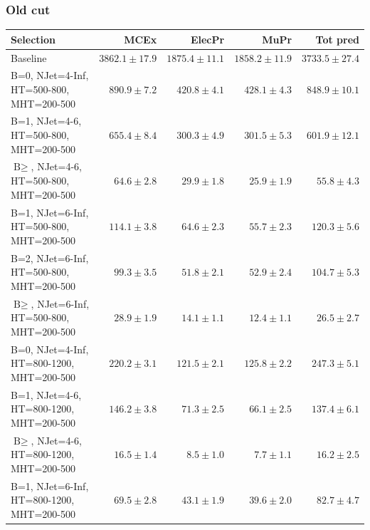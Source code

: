 \documentclass{beamer}
\begin{document}
\begin{frame}
\frametitle{Old \deltaphi cut}
\tiny
 \begin{tabular}{lrrrr}
\toprule
                                       Selection  &                     MCEx  &           ElecPr  &             MuPr  &          Tot pred  \\ 
\midrule
                                        Baseline &           $3862.1\pm17.9$&           $1875.4\pm11.1$&           $1858.2\pm11.9$&               $3733.5\pm27.4$ \\ 
    B=0, NJet=4-Inf, HT=500-800, MHT=200-500 &             $890.9\pm7.2$&             $420.8\pm4.1$&             $428.1\pm4.3$&                $848.9\pm10.1$ \\ 
      B=1, NJet=4-6, HT=500-800, MHT=200-500 &             $655.4\pm8.4$&             $300.3\pm4.9$&             $301.5\pm5.3$&                $601.9\pm12.1$ \\ 
      $\text{B}\geq$, NJet=4-6, HT=500-800, MHT=200-500 &              $64.6\pm2.8$&              $29.9\pm1.8$&              $25.9\pm1.9$&                  $55.8\pm4.3$ \\ 
    B=1, NJet=6-Inf, HT=500-800, MHT=200-500 &             $114.1\pm3.8$&              $64.6\pm2.3$&              $55.7\pm2.3$&                 $120.3\pm5.6$ \\ 
    B=2, NJet=6-Inf, HT=500-800, MHT=200-500 &              $99.3\pm3.5$&              $51.8\pm2.1$&              $52.9\pm2.4$&                 $104.7\pm5.3$ \\ 
    $\text{B}\geq$, NJet=6-Inf, HT=500-800, MHT=200-500 &              $28.9\pm1.9$&              $14.1\pm1.1$&              $12.4\pm1.1$&                  $26.5\pm2.7$ \\ 
   B=0, NJet=4-Inf, HT=800-1200, MHT=200-500 &             $220.2\pm3.1$&             $121.5\pm2.1$&             $125.8\pm2.2$&                 $247.3\pm5.1$ \\ 
     B=1, NJet=4-6, HT=800-1200, MHT=200-500 &             $146.2\pm3.8$&              $71.3\pm2.5$&              $66.1\pm2.5$&                 $137.4\pm6.1$ \\ 
     $\text{B}\geq$, NJet=4-6, HT=800-1200, MHT=200-500 &              $16.5\pm1.4$&               $8.5\pm1.0$&               $7.7\pm1.1$&                  $16.2\pm2.5$ \\ 
   B=1, NJet=6-Inf, HT=800-1200, MHT=200-500 &              $69.5\pm2.8$&              $43.1\pm1.9$&              $39.6\pm2.0$&                  $82.7\pm4.7$ \\ 

\end{tabular}
\end{frame}
\end{document}
